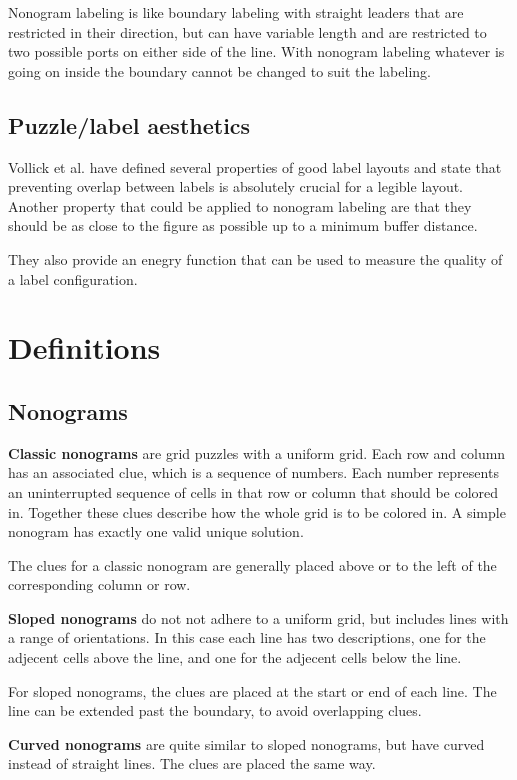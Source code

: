 \documentclass[a4paper]{article}
\begin{document}
Nonogram labeling is like boundary labeling with straight leaders that are restricted in their direction, but can have variable length and are restricted to two possible ports on either side of the line. With nonogram labeling whatever is going on inside the boundary cannot be changed to suit the labeling.

\subsection{Puzzle/label aesthetics}
Vollick et al. \cite{vollick2007specifying} have defined several properties of good label layouts and state that preventing overlap between labels is absolutely crucial for a legible layout. Another property that could be applied to nonogram labeling are that they should be as close to the figure as possible up to a minimum buffer distance.

They also provide an enegry function that can be used to measure the quality of a label configuration.

\section{Definitions}
\subsection{Nonograms}
\textbf{Classic nonograms} are grid puzzles with a uniform grid. Each row and column has an associated clue, which is a sequence of numbers. Each number represents an uninterrupted sequence of cells in that row or column that should be colored in. Together these clues describe how the whole grid is to be colored in. A simple nonogram has exactly one valid unique solution.

The clues for a classic nonogram are generally placed above or to the left of the corresponding column or row.

\textbf{Sloped nonograms} do not not adhere to a uniform grid, but includes lines with a range of orientations. In this case each line has two descriptions, one for the adjecent cells above the line, and one for the adjecent cells below the line. 

For sloped nonograms, the clues are placed at the start or end of each line. The line can be extended past the boundary, to avoid overlapping clues.

\textbf{Curved nonograms} are quite similar to sloped nonograms, but have curved instead of straight lines. The clues are placed the same way.
\end{document}
